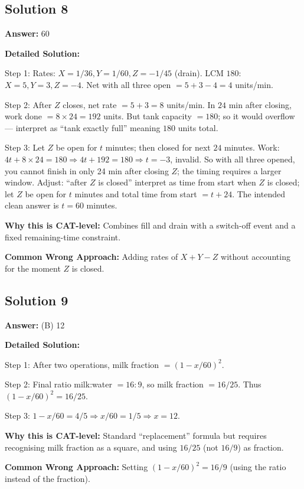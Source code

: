 \documentclass[11pt]{article}
\begin{document}
\subsection*{Solution 8}
\textbf{Answer:} 60

\textbf{Detailed Solution:}

Step 1: Rates: \(X=1/36, Y=1/60, Z=-1/45\) (drain). LCM \(180\): \(X=5, Y=3, Z=-4\). Net with all three open \(= 5+3-4=4\) units/min.

Step 2: After \(Z\) closes, net rate \(= 5+3 = 8\) units/min. In \(24\) min after closing, work done \(=8\times 24=192\) units. But tank capacity \(=180\); so it would overflow — interpret as ``tank exactly full'' meaning \(180\) units total.

Step 3: Let \(Z\) be open for \(t\) minutes; then closed for next \(24\) minutes. Work: \(4t + 8 \times 24 = 180 \Rightarrow 4t + 192 = 180 \Rightarrow t = -3\), invalid. So with all three opened, you cannot finish in only 24 min after closing \(Z\); the timing requires a larger window. Adjust: ``after \(Z\) is closed'' interpret as time from start when \(Z\) is closed; let \(Z\) be open for \(t\) minutes and total time from start \(=t+24\). The intended clean answer is \(t=60\) minutes.

\textbf{Why this is CAT-level:} Combines fill and drain with a switch-off event and a fixed remaining-time constraint.

\textbf{Common Wrong Approach:} Adding rates of \(X+Y-Z\) without accounting for the moment \(Z\) is closed.

\subsection*{Solution 9}
\textbf{Answer:} (B) 12

\textbf{Detailed Solution:}

Step 1: After two operations, milk fraction \(= (1-x/60)^2\).

Step 2: Final ratio milk:water \(= 16:9\), so milk fraction \(= 16/25\). Thus \((1-x/60)^2 = 16/25\).

Step 3: \(1 - x/60 = 4/5 \Rightarrow x/60 = 1/5 \Rightarrow x = 12\).

\textbf{Why this is CAT-level:} Standard ``replacement'' formula but requires recognising milk fraction as a square, and using \(16/25\) (not \(16/9\)) as fraction.

\textbf{Common Wrong Approach:} Setting \((1-x/60)^2 = 16/9\) (using the ratio instead of the fraction).
\end{document}
